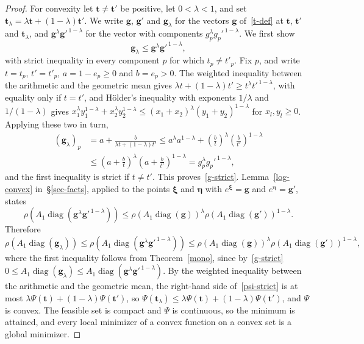 \documentclass[11pt]{article}
\theoremstyle{plain}
\theoremstyle{definition}
\theoremstyle{remark}
\numberwithin{equation}{section}
\numberwithin{figure}{section}
\numberwithin{table}{section}
\numberwithin{algorithm}{section}
\begin{document}
\begin{proof}
For convexity let $\bm t\neq\bm t'$ be positive, let $0<\lambda<1$, and set
$\bm t_\lambda=\lambda\bm t+(1-\lambda)\bm t'$. We write $\bm g$, $\bm g'$ and
$\bm g_\lambda$ for the vectors $\bm g$ of~\eqref{t-def} at $\bm t$, $\bm t'$
and $\bm t_\lambda$, and $\bm g^{\lambda}\bm g'^{\,1-\lambda}$ for the vector
with components $g_p^{\lambda}g_p'^{\,1-\lambda}$. We first show
\begin{equation}\label{g-strict}
\bm g_\lambda\le\bm g^{\lambda}\bm g'^{\,1-\lambda},
\end{equation}
with strict inequality in every component $p$ for which $t_p\neq t'_p$.
Fix $p$, and write $t=t_p$, $t'=t'_p$, $a=1-e_p\ge 0$ and
$b=e_p>0$. The weighted inequality between the arithmetic and the
geometric mean gives $\lambda t+(1-\lambda)t'\ge t^{\lambda}t'^{\,1-\lambda}$,
with equality only if $t=t'$, and H\"older's inequality with exponents
$1/\lambda$ and $1/(1-\lambda)$ gives
$x_1^{\lambda}y_1^{1-\lambda}+x_2^{\lambda}y_2^{1-\lambda}\le\left(x_1+x_2\right)^{\lambda}\left(y_1+y_2\right)^{1-\lambda}$
for $x_l,y_l\ge 0$. Applying these two in turn,
\begin{equation}
\begin{aligned}
\left(\bm g_\lambda\right)_p
&=a+\frac{b}{\lambda t+(1-\lambda)t'}
\le a^{\lambda}a^{1-\lambda}+\left(\frac{b}{t}\right)^{\lambda}\left(\frac{b}{t'}\right)^{1-\lambda}\\
&\le\left(a+\frac{b}{t}\right)^{\lambda}\left(a+\frac{b}{t'}\right)^{1-\lambda}
=g_p^{\lambda}g_p'^{\,1-\lambda},
\end{aligned}
\end{equation}
and the first inequality is strict if $t\neq t'$. This
proves~\eqref{g-strict}. Lemma~\ref{log-convex} in~\S\ref{sec-facts}, applied to
the points $\bm\xi$ and $\bm\eta$ with $e^{\bm\xi}=\bm g$ and $e^{\bm\eta}=\bm g'$, states
\begin{equation}
\rho\left(A_1\operatorname{diag}\left(\bm g^{\lambda}\bm g'^{\,1-\lambda}\right)\right)
\le\rho\left(A_1\operatorname{diag}(\bm g)\right)^{\lambda}
\rho\left(A_1\operatorname{diag}(\bm g')\right)^{1-\lambda}.
\end{equation}
Therefore
\begin{equation}\label{psi-strict}
\rho\left(A_1\operatorname{diag}\left(\bm g_\lambda\right)\right)
\le\rho\left(A_1\operatorname{diag}\left(\bm g^{\lambda}\bm g'^{\,1-\lambda}\right)\right)
\le\rho\left(A_1\operatorname{diag}(\bm g)\right)^{\lambda}
\rho\left(A_1\operatorname{diag}(\bm g')\right)^{1-\lambda},
\end{equation}
where the first inequality follows from Theorem~\ref{mono}, since
by~\eqref{g-strict}
$0\le A_1\operatorname{diag}\left(\bm g_\lambda\right)\le A_1\operatorname{diag}\left(\bm g^{\lambda}\bm g'^{\,1-\lambda}\right)$.
By the weighted inequality between the arithmetic and the geometric mean, the
right-hand side of~\eqref{psi-strict} is at most
$\lambda\Psi(\bm t)+(1-\lambda)\Psi(\bm t')$, so
$\Psi\left(\bm t_\lambda\right)\le\lambda\Psi(\bm t)+(1-\lambda)\Psi(\bm t')$,
and $\Psi$ is convex. The feasible set is compact and
$\Psi$ is continuous, so the minimum is attained, and every local minimizer of
a convex function on a convex set is a global minimizer.


\end{proof}
\end{document}
